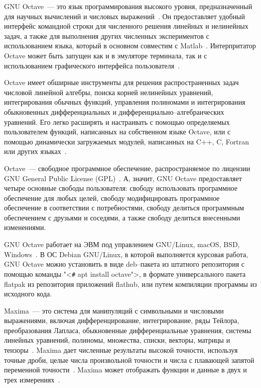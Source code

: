 \documentclass[oneside, final, 14pt]{extarticle}
\begin{document}
GNU Octave~--- это язык программирования высокого уровня, предназначенный для научных вычислений и числовых выражений~\cite{site:octave}.
Он предоставляет удобный интерфейс командной строки для численного решения линейных и нелинейных задач, а также для выполнения других численных экспериментов с использованием языка, который в основном совместим с Matlab~\cite{site:octave}. Интерпритатор Octave может быть запущен как и в эмуляторе терминала, так и с использованием графического интерфейса пользователя~\cite{site:octave}.
\par
Octave имеет обширные инструменты для решения распространенных задач числовой линейной алгебры, поиска корней нелинейных уравнений, интегрирования обычных функций, управления полиномами и интегрирования обыкновенных дифференциальных и дифференциально--алгебраических уравнений.
Его легко расширять и настраивать с помощью определяемых пользователем функций, написанных на собственном языке Octave, или с помощью динамически загружаемых модулей, написанных на C++, C, Fortran или других языках~\cite{site:octave}.
\par
Octave~--- свободное программное обеспечение, распространяемое по лицензии GNU General Public License (GPL)~\cite{site:octave}. 
А, значит, GNU Octave предоставляет четыре основные свободы пользователя: свободу использовать программное обеспечение для любых целей, свободу модифицировать программное обеспечение в соответствии с потребностями, свободу делиться программным обеспечением с друзьями и соседями, а также свободу делиться внесенными изменениями.
\par
GNU Octave работает на ЭВМ под управлением GNU/Linux, macOS, BSD, Windows~\cite{site:octave}.
В ОС Debian GNU/Linux, в которой выполняется курсовая работа, GNU Octave можно установить в виде deb--пакета из штатного репозитория с помощью команды "<{\ttfamily \verb|#| apt install octave}">, в формате универсального пакета flatpak из репозитория приложений flathub, или путем компиляции программы из исходного кода.
\par
Maxima~--- это система для манипуляций с символьными и числовыми выражениями, включая дифференцирование, интегрирование, ряды Тейлора, преобразования Лапласа, обыкновенные дифференциальные уравнения, системы линейных уравнений, полиномы, множества, списки, векторы, матрицы и тензоры~\cite{site:maxima}.
Maxima дает численные результаты высокой точности, используя точные дроби, целые числа произвольной точности и числа с плавающей запятой переменной точности~\cite{site:maxima}.
Maxima может отображать функции и данные в двух и трех измерениях~\cite{site:maxima}.
\end{document}
